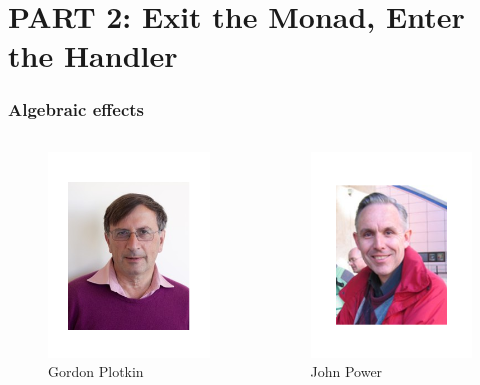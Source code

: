 \section{PART 2: Exit the Monad, Enter the Handler}
\begin{frame}
  \frametitle{Algebraic effects}
  \begin{columns}
    \begin{column}{0.5\textwidth}
      \begin{center}
        \begin{figure}
          \includegraphics[scale=0.3]{figures/gordonplotkin.png}
          \caption{Gordon Plotkin}
        \end{figure}
      \end{center}
    \end{column}
    \begin{column}{0.5\textwidth}
      \begin{center}
        \begin{figure}
          \includegraphics[scale=0.3]{figures/johnpower.png}
          \caption{John Power}
        \end{figure}
      \end{center}
    \end{column}
  \end{columns}
\end{frame}

